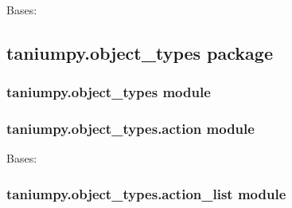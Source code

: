 \documentclass[letterpaper,10pt,english]{sphinxmanual}
\begin{document}

\begin{fulllineitems}
\label{taniumpy.question_asker:taniumpy.question_asker.QuestionTimeoutException}
Bases: \href{http://docs.python.org/2.7/library/exceptions.html\#exceptions.Exception}{}

\end{fulllineitems}



\subsection{taniumpy.object\_types package}
\label{taniumpy.object_types:taniumpy-object-types-package}\label{taniumpy.object_types::doc}

\subsubsection{taniumpy.object\_types module}
\label{taniumpy.object_types:taniumpy-object-types-module}\label{taniumpy.object_types:module-taniumpy.object_types}

\subsubsection{taniumpy.object\_types.action module}
\label{taniumpy.object_types:taniumpy-object-types-action-module}\label{taniumpy.object_types:module-taniumpy.object_types.action}

\begin{fulllineitems}
\label{taniumpy.object_types:taniumpy.object_types.action.Action}
Bases: {\hyperref[taniumpy.object_types:taniumpy.object_types.base.BaseType]{}}

\end{fulllineitems}



\subsubsection{taniumpy.object\_types.action\_list module}
\label{taniumpy.object_types:taniumpy-object-types-action-list-module}\label{taniumpy.object_types:module-taniumpy.object_types.action_list}
\end{document}
